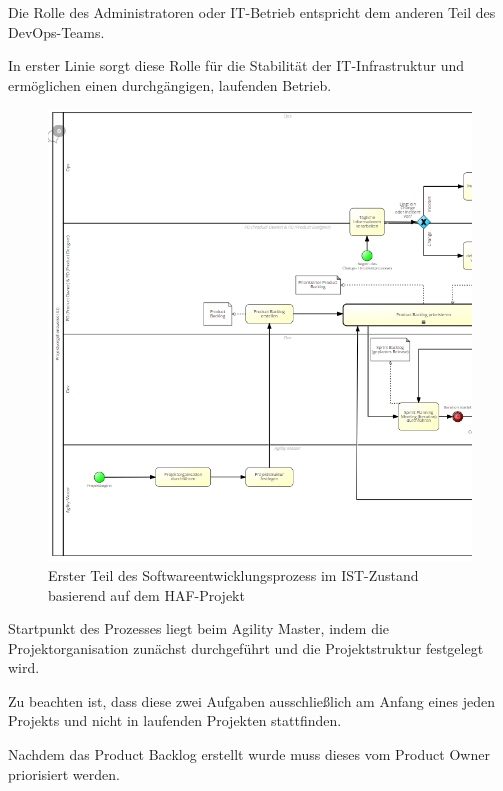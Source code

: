 Die Rolle des Administratoren oder IT-Betrieb entspricht dem anderen Teil des DevOps-Teams. 

In erster Linie sorgt diese Rolle für die Stabilität der IT-Infrastruktur und ermöglichen einen durchgängigen, laufenden Betrieb.  

\begin{figure}[h]
    \centering
    \includegraphics[scale=0.7]{Bilder/IST-Prozess_first Part.png}
    \caption{Erster Teil des Softwareentwicklungsprozess im IST-Zustand basierend auf dem HAF-Projekt}
\end{figure}

\newpage Startpunkt des Prozesses liegt beim Agility Master, indem die Projektorganisation zunächst durchgeführt und die Projektstruktur festgelegt wird.

Zu beachten ist, dass diese zwei Aufgaben ausschließlich am Anfang eines jeden Projekts und nicht in laufenden Projekten stattfinden. 

Nachdem das Product Backlog erstellt wurde muss dieses vom Product Owner priorisiert werden. 

